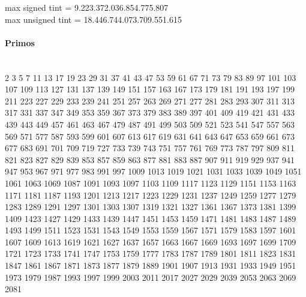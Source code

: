 max signed tint = 9.223.372.036.854.775.807 \\
max unsigned tint = 18.446.744.073.709.551.615
\paragraph{Primos} \ \\
2 3 5 7 11 13 17 19 23 29
31 37 41 43 47 53 59 61 67 71
73 79 83 89 97 101 103 107 109 113
127 131 137 139 149 151 157 163 167 173
179 181 191 193 197 199 211 223 227 229
233 239 241 251 257 263 269 271 277 281
283 293 307 311 313 317 331 337 347 349
353 359 367 373 379 383 389 397 401 409
419 421 431 433 439 443 449 457 461 463
467 479 487 491 499 503 509 521 523 541
547 557 563 569 571 577 587 593 599 601
607 613 617 619 631 641 643 647 653 659
661 673 677 683 691 701 709 719 727 733
739 743 751 757 761 769 773 787 797 809
811 821 823 827 829 839 853 857 859 863
877 881 883 887 907 911 919 929 937 941
947 953 967 971 977 983 991 997 1009 1013
1019 1021 1031 1033 1039 1049 1051 1061 1063 1069
1087 1091 1093 1097 1103 1109 1117 1123 1129 1151
1153 1163 1171 1181 1187 1193 1201 1213 1217 1223
1229 1231 1237 1249 1259 1277 1279 1283 1289 1291
1297 1301 1303 1307 1319 1321 1327 1361 1367 1373
1381 1399 1409 1423 1427 1429 1433 1439 1447 1451
1453 1459 1471 1481 1483 1487 1489 1493 1499 1511
1523 1531 1543 1549 1553 1559 1567 1571 1579 1583
1597 1601 1607 1609 1613 1619 1621 1627 1637 1657
1663 1667 1669 1693 1697 1699 1709 1721 1723 1733
1741 1747 1753 1759 1777 1783 1787 1789 1801 1811
1823 1831 1847 1861 1867 1871 1873 1877 1879 1889
1901 1907 1913 1931 1933 1949 1951 1973 1979 1987
1993 1997 1999 2003 2011 2017 2027 2029 2039 2053
2063 2069 2081
 

